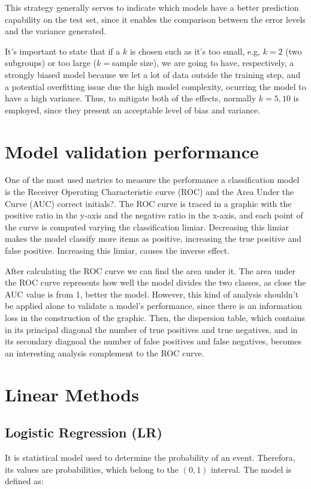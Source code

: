 \documentclass[conference]{IEEEtran}
\newcommand{\reviewNormal}[1]{{\color{yellow} #1}} %
\begin{document}
This strategy generally serves to indicate which models have a better prediction capability
on the test set, since it enables the comparison between the error levels and the variance
generated.

It's important to state that if a $k$ is chosen such as it's too small, e.g, $k=2$ 
(two subgroups) or too large ($k=$sample size), we are going to have, respectively, a 
strongly biased model because we let a lot of data outside the training step, and a potential
overfitting issue due the high model complexity, ocurring the model to have a high variance.
Thus, to mitigate both of the effects, normally $k=5,10$ is employed, since they present
an acceptable level of bias and variance.

\section{Model validation performance}

One of the most used metrics to measure the performance a classification model is the
Receiver Operating Characteristic curve (ROC) and the Area Under the Curve (AUC) \reviewNormal{correct initials?}.
 The ROC curve is traced in a graphic with the positive ratio in the y-axis and the negative
ratio in the x-axis, and each point of the curve is computed varying the classification
limiar. Decreasing this limiar makes the model classify more items as positive, increasing
the true positive and false positive. Increasing this limiar, causes the inverse
effect.

After calculating the ROC curve we can find the area under it. The area under the ROC curve
represents how well the model divides the two classes, as close the AUC value is from 1, 
better the model. However, this kind of analysis shouldn't be applied alone to validate
 a model's performance, since there is an information loss in the construction of the 
 graphic. Then, the dispersion table, which contains in its principal diagonal the number
 of true positives and true negatives, and in its secondary diagnoal the number of 
 false positives and false negatives, becomes an interesting analysis complement to the 
 ROC curve.

 \section{Linear Methods}
\subsection{Logistic Regression (LR)}
It is statistical model used to determine the probability of an event. Therefora, its values 
are probabilities, which belong to the $(0,1)$ interval. 
The model is defined as:
\end{document}

